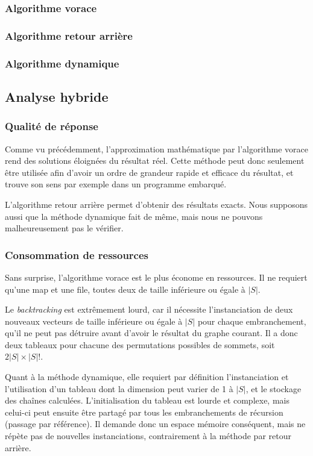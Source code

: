 \documentclass[10pt,a4paper]{article}
\begin{document}
\subsubsection{Algorithme vorace}
\subsubsection{Algorithme retour arrière}
\subsubsection{Algorithme dynamique}

\subsection{Analyse hybride}

\subsubsection{Qualité de réponse}

Comme vu précédemment, l'approximation mathématique par l'algorithme vorace rend des solutions éloignées du résultat réel. Cette méthode peut donc seulement être utilisée afin d'avoir un ordre de grandeur rapide et efficace du résultat, et trouve son sens par exemple dans un programme embarqué.

L'algorithme retour arrière permet d'obtenir des résultats exacts. Nous supposons aussi que la méthode dynamique fait de même, mais nous ne pouvons malheureusement pas le vérifier.

\subsubsection{Consommation de ressources}

Sans surprise, l'algorithme vorace est le plus économe en ressources. Il ne requiert qu'une map et une file, toutes deux de taille inférieure ou égale à $ |S| $.

Le \textit{backtracking} est extrêmement lourd, car il nécessite l'instanciation de deux nouveaux vecteurs de taille inférieure ou égale à $ |S| $ pour chaque embranchement, qu'il ne peut pas détruire avant d'avoir le résultat du graphe courant. Il a donc deux tableaux pour chacune des permutations possibles de sommets, soit $ 2 |S| \times |S|!$.

Quant à la méthode dynamique, elle requiert par définition l'instanciation et l'utilisation d'un tableau dont la dimension peut varier de 1 à $|S|$, et le stockage des chaînes calculées. L'initialisation du tableau est lourde et complexe, mais celui-ci peut ensuite être partagé par tous les embranchements de récursion (passage par référence). Il demande donc un espace mémoire conséquent, mais ne répète pas de nouvelles instanciations, contrairement à la méthode par retour arrière.
\end{document}
